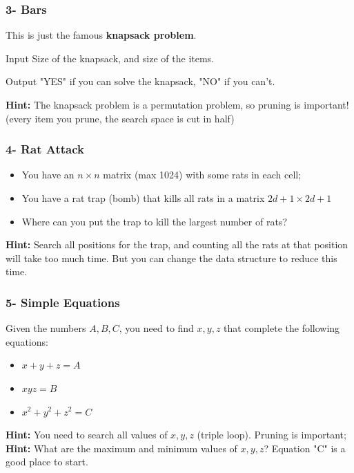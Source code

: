 \begin{frame}
  \frametitle{3- Bars}

  This is just the famous {\bf knapsack problem}.

  \begin{block}{Input}
    Size of the knapsack, and size of the items.
  \end{block}
  \begin{exampleblock}{Output}
    "YES" if you can solve the knapsack, "NO" if you can't.
  \end{exampleblock}

  {\bf Hint:} The knapsack problem is a permutation problem, so pruning is important! (every item you prune, the search space is cut in half)\\
\end{frame}

\begin{frame}
  \frametitle{4- Rat Attack}
    \begin{block}{}
      \begin{itemize}
      \item You have an $n\times n$ matrix (max 1024) with some rats in each cell;
      \item You have a rat trap (bomb) that kills all rats in a matrix $2d+1 \times 2d+1$
      \item Where can you put the trap to kill the largest number of rats?
      \end{itemize}
    \end{block}\bigskip

    {\bf Hint:} Search all positions for the trap, and counting all the rats at that position will take too much time. But you can change the data structure to reduce this time.
\end{frame}

\begin{frame}
  \frametitle{5- Simple Equations}

  \begin{block}{}
    Given the numbers $A, B, C$, you need to find $x, y, z$ that complete the following equations:
    \begin{itemize}
      \item $x + y + z = A$
      \item $xyz = B$
      \item $x^2 + y^2 + z^2 = C$
    \end{itemize}
  \end{block}

  {\bf Hint:} You need to search all values of $x,y,z$ (triple loop). Pruning is important;\\
  {\bf Hint:} What are the maximum and minimum values of $x,y,z$? Equation "C" is a good place to start.
\end{frame}

